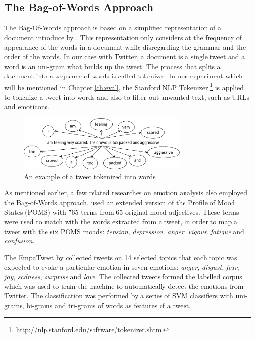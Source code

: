 \subsection{The Bag-of-Words Approach}
The Bag-Of-Words approach is based on a simplified representation of a document introduce by \citet{joachims1996probabilistic}. This representation only considers at the frequency of appearance of the words in a document while disregarding the grammar and the order of the words. In our case with Twitter, a document is a single tweet and a word is an uni-gram what builds up the tweet. The process that splits a document into a sequence of words is called tokenizer. In our experiment which will be mentioned in Chapter \ref{ch:eval}, the Stanford NLP Tokenizer \footnote{http://nlp.stanford.edu/software/tokenizer.shtml} is applied to tokenize a tweet into words and also to filter out unwanted text, such as URLs and emoticons. 

\begin{figure}[htb!] 
\centering    
\includegraphics[width=0.75\textwidth]{Tokenizer}
\caption{An example of a tweet tokenized into words}
\label{fig:tokenizer}
\end{figure}

As mentioned earlier, a few related researches on emotion analysis also employed the Bag-of-Words approach. \citet{bollen2009modeling} used an extended version of the Profile of Mood States (POMS) with 765 terms from 65 original mood adjectives. These terms were used to match with the words extracted from a tweet, in order to map a tweet with the six POMS moods: \textit{tension}, \textit{depression}, \textit{anger}, \textit{vigour}, \textit{fatique} and \textit{confusion}.

The EmpaTweet by \citet{roberts2012empatweet} collected tweets on 14 selected topics that each topic was expected to evoke a particular emotion in seven emotions: \textit{anger}, \textit{disgust}, \textit{fear}, \textit{joy}, \textit{sadness}, \textit{surprise} and \textit{love}. The collected tweets formed the labelled corpus which was used to train the machine to automatically detect the emotions from Twitter. The classification was performed by a series of SVM classifiers with uni-grams, bi-grams and tri-grams of words as features of a tweet.

